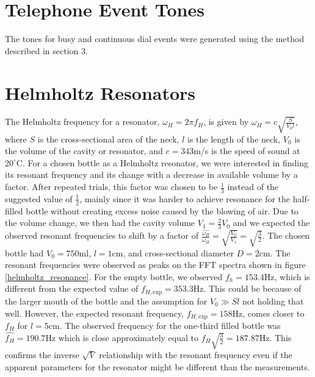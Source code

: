 \documentclass[10pt]{article}
\begin{document}
\section{Telephone Event Tones}
The tones for busy and continuous dial events were generated using the method described in section 3.

\section{Helmholtz Resonators}
The Helmholtz frequency for a resonator, $\omega_H = 2\pi f_H$, is given by $\omega_H = c\sqrt{\frac{S}{V_0l}}$, where $S$ is the cross-sectional area of the neck, $l$ is the length of the neck, $V_0$ is the volume of the cavity or resonator, and $c=343$m/s is the speed of sound at $20^\circ$C. For a chosen bottle as a Helmholtz resonator, we were interested in finding its resonant frequency and its change with a decrease in available volume by a factor. After repeated trials, this factor was chosen to be $\frac{1}{3}$ instead of the suggested value of $\frac{1}{2}$, mainly since it was harder to achieve resonance for the half-filled bottle without creating excess noise caused by the blowing of air. Due to the volume change, we then had the cavity volume $V_1 = \frac{2}{3}V_0$ and we expected the observed resonant frequencies to shift by a factor of $\frac{\widehat{\omega_H}}{\omega_H} = \sqrt{\frac{V_0}{V_1}} = \sqrt{\frac{3}{2}}$. The chosen bottle had $V_0 = 750$ml, $l=1$cm, and cross-sectional diameter $D=2$cm. The resonant frequencies were observed as peaks on the FFT spectra shown in figure \ref{helmholtz_resonance}. For the empty bottle, we observed $f_h = 153.4$Hz, which is different from the expected value of $f_{H, \text{exp}} = 353.3$Hz. This could be because of the larger mouth of the bottle and the assumption for $V_0 \gg Sl$ not holding that well. However, the expected resonant frequency, $f_{H, \text{exp}} = 158$Hz, comes closer to $f_{H}$ for $l=5$cm. The observed frequency for the one-third filled bottle was $\widehat{f_H} = 190.7$Hz which is close approximately equal to $f_H\sqrt{\frac{3}{2}} = 187.87$Hz. This confirms the inverse $\sqrt{V}$ relationship with the resonant frequency even if the apparent parameters for the resonator might be different than the measurements.
\end{document}
